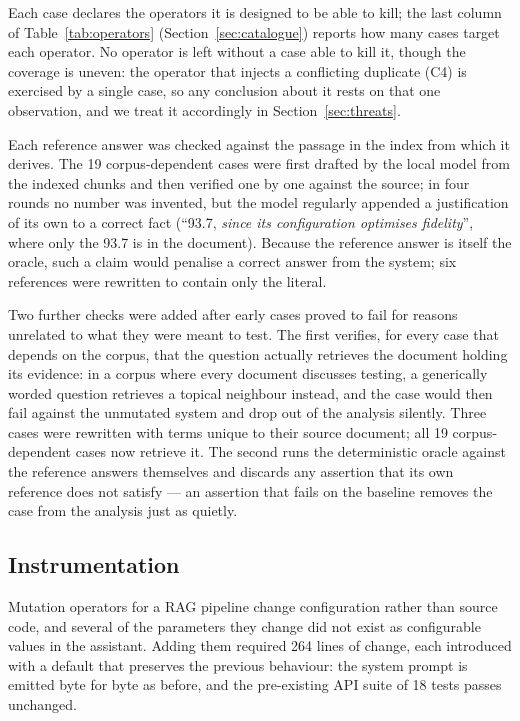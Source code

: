 \documentclass[a4paper,fleqn]{cas-dc}
\begin{document}
Each case declares the operators it is designed to be able to kill; the last
column of Table~\ref{tab:operators} (Section~\ref{sec:catalogue}) reports how
many cases target each operator. No operator is left without a case able to
kill it, though the coverage is uneven: the operator that injects a conflicting
duplicate (C4) is exercised by a single case, so any conclusion about it rests
on that one observation, and we treat it accordingly in
Section~\ref{sec:threats}.

Each reference answer was checked against the passage in the index from which
it derives. The 19 corpus-dependent cases were first drafted by the local model
from the indexed chunks and then verified one by one against the source; in
four rounds no number was invented, but the model regularly appended a
justification of its own to a correct fact (``93.7, \emph{since its
configuration optimises fidelity}'', where only the 93.7 is in the document).
Because the reference answer is itself the oracle, such a claim would penalise
a correct answer from the system; six references were rewritten to contain
only the literal.

Two further checks were added after early cases proved to fail for reasons
unrelated to what they were meant to test. The first verifies, for every case
that depends on the corpus, that the question actually retrieves the document
holding its evidence: in a corpus where every document discusses testing, a
generically worded question retrieves a topical neighbour instead, and the case
would then fail against the unmutated system and drop out of the analysis
silently. Three cases were rewritten with terms unique to their source
document; all 19 corpus-dependent cases now retrieve it. The second runs the
deterministic oracle against the reference answers themselves and discards any
assertion that its own reference does not satisfy --- an assertion that fails
on the baseline removes the case from the analysis just as quietly.

\subsection{Instrumentation}
\label{sec:instrumentation}

Mutation operators for a RAG pipeline change configuration rather than source
code, and several of the parameters they change did not exist as configurable
values in the assistant. Adding them required 264 lines of change, each
introduced with a default that preserves the previous behaviour: the system
prompt is emitted byte for byte as before, and the pre-existing API suite of 18
tests passes unchanged.
\end{document}
